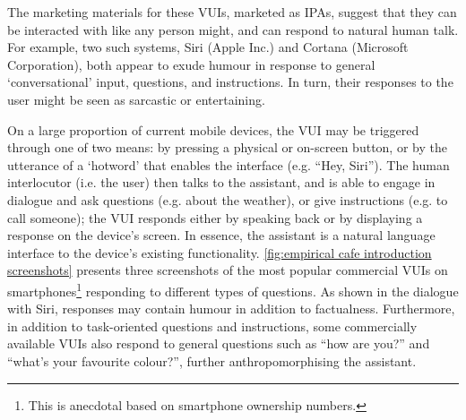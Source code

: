 The marketing materials for these \acp{VUI}, marketed as \acfp{IPA}, suggest that they can be interacted with like any person might, and can respond to natural human talk. %
For example, two such systems, Siri (Apple Inc.) and Cortana (Microsoft Corporation), both appear to exude humour in response to general `conversational' input, questions, and instructions.
In turn, their responses to the user might be seen as sarcastic or entertaining.

On a large proportion of current mobile devices, the \ac{VUI} may be triggered through one of two means: by pressing a physical or on-screen button, or by the utterance of a `hotword' that enables the interface (e.g. ``Hey, Siri'').
The human interlocutor (i.e. the user) then talks to the assistant, and is able to engage in dialogue and ask questions (e.g. about the weather), or give instructions (e.g. to call someone); the \ac{VUI} responds either by speaking back or by displaying a response on the device's screen.
In essence, the assistant is a natural language interface to the device's existing functionality.
\autoref{fig:empirical cafe introduction screenshots} presents three screenshots of the most popular commercial \acp{VUI} on smartphones\footnote{This is anecdotal based on smartphone ownership numbers.} responding to different types of questions.
As shown in the dialogue with Siri, responses may contain humour in addition to factualness.
Furthermore, in addition to task-oriented questions and instructions, some commercially available \acp{VUI} also respond to general questions such as ``how are you?'' and ``what's your favourite colour?'', further anthropomorphising the assistant.

